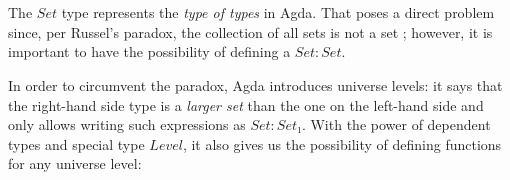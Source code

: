 {\begin{code}%
\>[0]\AgdaSpace{}%
\AgdaSpace{}%
\AgdaSymbol{(}\AgdaSpace{}%
\AgdaSymbol{:}\AgdaSpace{}%
\AgdaSymbol{)}\AgdaSpace{}%
\AgdaSymbol{:}\AgdaSpace{}%
\AgdaSpace{}%
\AgdaSpace{}%
\AgdaSpace{}%
\<%
\\
\>[0][@{}l@{\AgdaIndent{0}}]%
\>[2]\AgdaInductiveConstructor{[]}%
\>[6]\AgdaSymbol{:}\AgdaSpace{}%
\AgdaSpace{}%
\AgdaSpace{}%
\<%
\\
%
\>[2]\AgdaSpace{}%
\AgdaSymbol{:}\AgdaSpace{}%
\AgdaSymbol{\{}\AgdaSpace{}%
\AgdaSymbol{:}\AgdaSpace{}%
\AgdaSymbol{\}}\AgdaSpace{}%
\AgdaSpace{}%
\AgdaSpace{}%
\AgdaSpace{}%
\AgdaSpace{}%
\AgdaSpace{}%
\AgdaSpace{}%
\AgdaSpace{}%
\AgdaSpace{}%
\AgdaSpace{}%
\AgdaSymbol{(}\AgdaSpace{}%
\AgdaSymbol{)}\<%
\end{code}

The $Set$ type represents the \emph{type of types} in Agda. That poses a direct problem since, per Russel's paradox, the collection of all sets is not a set \cite{Unknown2019OfficialHttps://agda.readthedocs.io/en/v2.5.4.2/index.html}; however, it is important to have the possibility of defining a $Set : Set$.

In order to circumvent the paradox, Agda introduces universe levels: it says that the right-hand side type is a \emph{larger set} than the one on the left-hand side and only allows writing such expressions as $Set : Set₁$. With the power of dependent types and special type $Level$, it also gives us the possibility of defining functions for any universe level:

}
